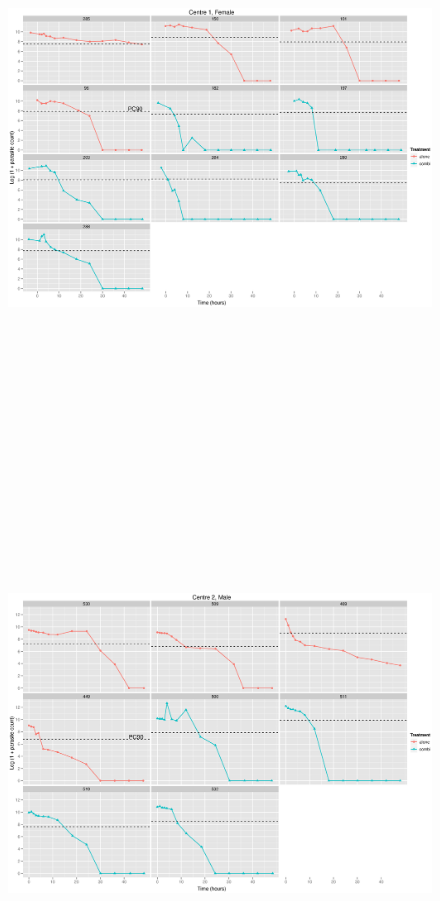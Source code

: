 \begin{singlespace}
\begin{figure}
\includegraphics[height=150mm]{Araw1F.eps}
\end{figure}
\begin{figure}
\includegraphics[height=150mm]{Araw2M.eps}

\end{figure}
\end{singlespace}
